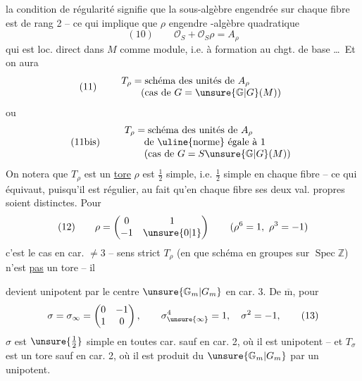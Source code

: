 la condition de régularité signifie que la sous-algèbre engendrée sur chaque fibre est de rang 2  -- ce qui implique que $\rho$ engendre -algèbre quadratique
\[
(10)\qquad \mathcal O_S+\mathcal O_S\rho=A_\rho
\]
qui est loc.  direct dans $M$ comme module, i.e. à formation  au chgt. de base \ldots\ Et on aura
\[
(11)\qquad
\begin{array}{l}
T_\rho=\text{schéma des unités de }A_\rho\\
\qquad\text{(cas de }G=\unsure{\mathbb G|G}(M)\text{)}
\end{array}
\]
ou
\[
(11\text{bis})\qquad
\begin{array}{l}
T_\rho=\text{schéma des unités de }A_\rho\\
\qquad\text{de \uline{norme} égale à }1\\
\qquad\text{(cas de }G=S\unsure{\mathbb G|G}(M)\text{)}
\end{array}
\]
On notera que $T_\rho$ est un \uline{tore}   $\rho$ est $\frac{1}{2}$ simple, i.e. $\frac{1}{2}$ simple en chaque fibre -- ce qui équivaut, puisqu'il est régulier, au fait qu'en chaque fibre ses deux val. propres soient distinctes. Pour
\[
(12)\qquad \rho=\begin{pmatrix}0&1\\-1&\unsure{0|1}\end{pmatrix}\qquad (\rho^6=1,\ \rho^3=-1)
\]
c'est  le cas en car. $\ne 3$ --   sens strict $T_\rho$ (en  que schéma en groupes sur $\operatorname{Spec}\mathbb Z$) n'est \uline{pas} un tore -- il


devient   unipotent par le centre $\unsure{\mathbb G_m|G_m}$ en car. 3. De $\overline{\mathrm m}$, pour
\[
\sigma=\sigma_\infty=\begin{pmatrix}0&-1\\1&0\end{pmatrix},\qquad
\sigma_{\unsure{\infty}}^4=1,\quad\sigma^2=-1,
\tag{13}
\]
$\sigma$ est $\unsure{\frac12}$ simple en toutes car. sauf en car. 2,
où il est unipotent -- et $T_\sigma$ est un
tore sauf en car. 2, où il  est
produit du  $\unsure{\mathbb G_m|G_m}$ par un unipotent.

